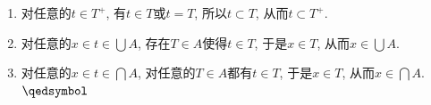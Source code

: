 
\begin{enumerate}
    \item 对任意的$t\in T^+$, 有$t\in T$或$t=T$,
    所以$t\subset T$, 从而$t\subset T^+$.
    \vspace{3pt}
    \item 对任意的$x\in t\in\displaystyle\bigcup A$, 存在$T\in A$使得$t\in T$,
    于是$x\in T$, 从而$\displaystyle x\in\bigcup A$.
    \vspace{3pt}
    \item 对任意的$x\in t\in\displaystyle\bigcap A$, 对任意的$T\in A$都有$t\in T$,
    于是$x\in T$, 从而$\displaystyle x\in\bigcap A$. \hfill $\qedsymbol$
\end{enumerate}

